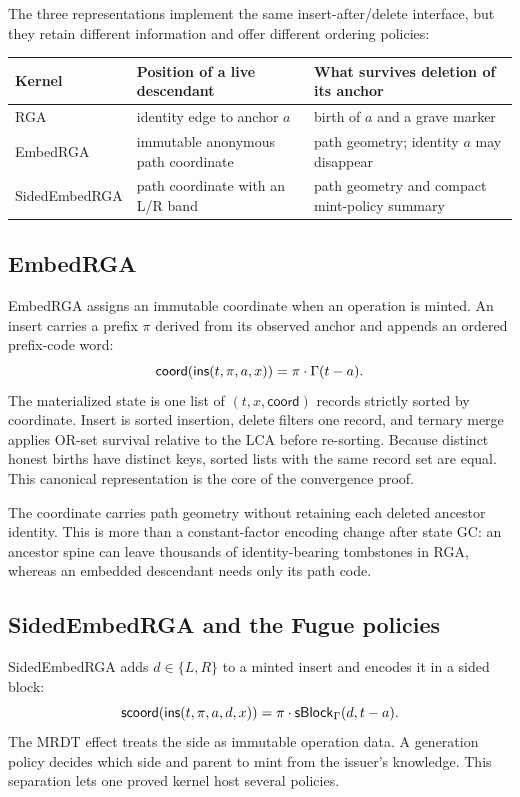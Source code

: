 The three representations implement the same insert-after/delete interface,
but they retain different information and offer different ordering policies:
\begin{center}
\begin{tabular}{@{}p{}p{}p{}@{}}
\toprule
Kernel & Position of a live descendant & What survives deletion of its anchor \\
\midrule
RGA & identity edge to anchor $a$ & birth of $a$ and a grave marker \\
EmbedRGA & immutable anonymous path coordinate & path geometry; identity $a$ may disappear \\
SidedEmbedRGA & path coordinate with an L/R band & path geometry and compact mint-policy summary \\
\bottomrule
\end{tabular}
\end{center}

\subsection{EmbedRGA}

EmbedRGA assigns an immutable coordinate when an operation is minted. An
insert carries a prefix $\pi$ derived from its observed anchor and appends an
ordered prefix-code word:
\[
  \mathsf{coord}(\mathsf{ins}(t,\pi,a,x))=\pi\cdot\Gamma(t-a).
\]
The materialized state is one list of $(t,x,\mathsf{coord})$ records strictly
sorted by coordinate. Insert is sorted insertion, delete filters one record,
and ternary merge applies OR-set survival relative to the LCA before
re-sorting. Because distinct honest births have distinct keys, sorted lists
with the same record set are equal. This canonical representation is the core
of the convergence proof.

The coordinate carries path geometry without retaining each deleted ancestor
identity. This is more than a constant-factor encoding change after state GC:
an ancestor spine can leave thousands of identity-bearing tombstones in RGA,
whereas an embedded descendant needs only its path code.

\subsection{SidedEmbedRGA and the Fugue policies}

SidedEmbedRGA adds $d\in\{L,R\}$ to a minted insert and encodes it in a
sided block:
\[
  \mathsf{scoord}(\mathsf{ins}(t,\pi,a,d,x))
    =\pi\cdot\mathsf{sBlock}_{\Gamma}(d,t-a).
\]
The MRDT effect treats the side as immutable operation data. A generation
policy decides which side and parent to mint from the issuer's knowledge.
This separation lets one proved kernel host several policies.

